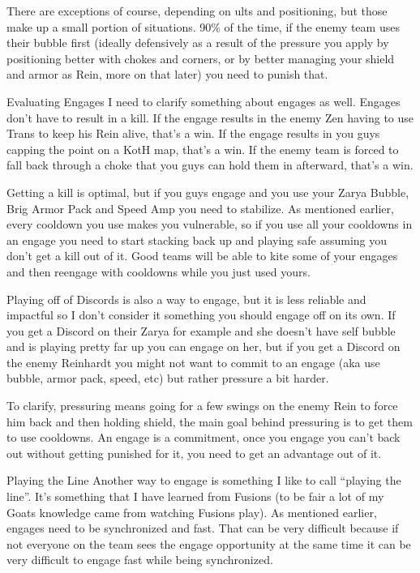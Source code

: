 There are exceptions of course, depending on ults and positioning, but those make up a small portion of situations. 90\% of the time, if the enemy team uses their bubble first (ideally defensively as a result of the pressure you apply by positioning better with chokes and corners, or by better managing your shield and armor as Rein, more on that later) you need to punish that.

Evaluating Engages
I need to clarify something about engages as well. Engages don’t have to result in a kill. If the engage results in the enemy Zen having to use Trans to keep his Rein alive, that’s a win. If the engage results in you guys capping the point on a KotH map, that’s a win. If the enemy team is forced to fall back through a choke that you guys can hold them in afterward, that’s a win.

Getting a kill is optimal, but if you guys engage and you use your Zarya Bubble, Brig Armor Pack and Speed Amp you need to stabilize. As mentioned earlier, every cooldown you use makes you vulnerable, so if you use all your cooldowns in an engage you need to start stacking back up and playing safe assuming you don’t get a kill out of it. Good teams will be able to kite some of your engages and then reengage with cooldowns while you just used yours.

Playing off of Discords is also a way to engage, but it is less reliable and impactful so I don’t consider it something you should engage off on its own. If you get a Discord on their Zarya for example and she doesn’t have self bubble and is playing pretty far up you can engage on her, but if you get a Discord on the enemy Reinhardt you might not want to commit to an engage (aka use bubble, armor pack, speed, etc) but rather pressure a bit harder.

To clarify, pressuring means going for a few swings on the enemy Rein to force him back and then holding shield, the main goal behind pressuring is to get them to use cooldowns. An engage is a commitment, once you engage you can’t back out without getting punished for it, you need to get an advantage out of it.






Playing the Line
Another way to engage is something I like to call “playing the line”. It’s something that I have learned from Fusions (to be fair a lot of my Goats knowledge came from watching Fusions play). As mentioned earlier, engages need to be synchronized and fast. That can be very difficult because if not everyone on the team sees the engage opportunity at the same time it can be very difficult to engage fast while being synchronized.

